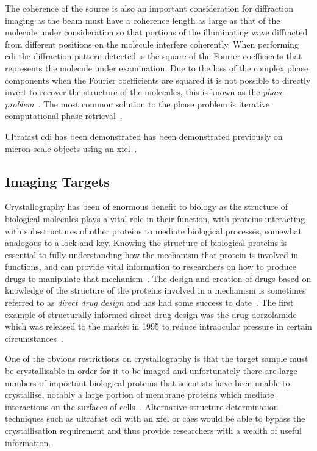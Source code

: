The coherence of the source is also an important consideration for diffraction imaging as the beam must have a coherence length as large as that of the molecule under consideration so that portions of the illuminating wave diffracted from different positions on the molecule interfere coherently.
When performing \gls{cdi} the diffraction pattern detected is the square of the Fourier coefficients that represents the molecule under examination.
Due to the loss of the complex phase components when the Fourier coefficients are squared it is not possible to directly invert to recover the structure of the molecules, this is known as the \emph{phase problem}~\cite{rodenburg_phase_1989}.
The most common solution to the phase problem is iterative computational phase-retrieval~\cite{chapman_coherent_2010}.

Ultrafast \gls{cdi} has been demonstrated has been demonstrated previously on micron-scale objects using an \gls{xfel}~\cite{chapman_femtosecond_2006}.

\subsection{Imaging Targets}

Crystallography has been of enormous benefit to biology as the structure of biological molecules plays a vital role in their function, with proteins interacting with sub-structures of other proteins to mediate biological processes, somewhat analogous to a lock and key.
Knowing the structure of biological proteins is essential to fully understanding how the mechanism that protein is involved in functions, and can provide vital information to researchers on how to produce drugs to manipulate that mechanism~\cite{aloy_structural_2006,almen_mapping_2009}.
The design and creation of drugs based on knowledge of the structure of the proteins involved in a mechanism is sometimes referred to as \emph{direct drug design} and has had some success to date~\cite{klebe_recent_2000,jhoti_structure-based_2007,mauser_recent_2008}.
The first example of structurally informed direct drug design was the drug dorzolamide which was released to the market in 1995 to reduce intraocular pressure in certain circumstances~\cite{greer_application_1994}.

One of the obvious restrictions on crystallography is that the target sample must be crystallisable in order for it to be imaged and unfortunately there are large numbers of important biological proteins that scientists have been unable to crystallise, notably a large portion of membrane proteins which mediate interactions on the surfaces of cells~\cite{geerlof_impact_2006}.
Alternative structure determination techniques such as ultrafast \gls{cdi} with an \gls{xfel} or \gls{caes} would be able to bypass the crystallisation requirement and thus provide researchers with a wealth of useful information.

